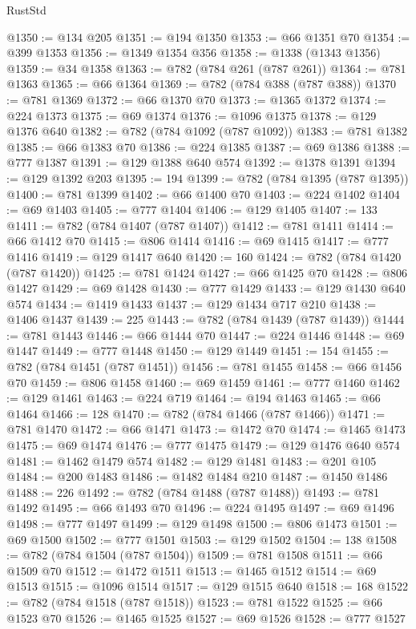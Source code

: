 \begin{lexlean}{RustStd}
\begin{coremodule}
@1350 := @134 @205
@1351 := @194 @1350
@1353 := @66 @1351 @70
@1354 := @399 @1353
@1356 := @1349 @1354 @356
@1358 := @1338 (@1343 @1356)
@1359 := @34 @1358
@1363 := @782 (@784 @261 (@787 @261))
@1364 := @781 @1363
@1365 := @66 @1364
@1369 := @782 (@784 @388 (@787 @388))
@1370 := @781 @1369
@1372 := @66 @1370 @70
@1373 := @1365 @1372
@1374 := @224 @1373
@1375 := @69 @1374
@1376 := @1096 @1375
@1378 := @129 @1376 @640
@1382 := @782 (@784 @1092 (@787 @1092))
@1383 := @781 @1382
@1385 := @66 @1383 @70
@1386 := @224 @1385
@1387 := @69 @1386
@1388 := @777 @1387
@1391 := @129 @1388 @640 @574
@1392 := @1378 @1391
@1394 := @129 @1392 @203
@1395 := 194
@1399 := @782 (@784 @1395 (@787 @1395))
@1400 := @781 @1399
@1402 := @66 @1400 @70
@1403 := @224 @1402
@1404 := @69 @1403
@1405 := @777 @1404
@1406 := @129 @1405
@1407 := 133
@1411 := @782 (@784 @1407 (@787 @1407))
@1412 := @781 @1411
@1414 := @66 @1412 @70
@1415 := @806 @1414
@1416 := @69 @1415
@1417 := @777 @1416
@1419 := @129 @1417 @640
@1420 := 160
@1424 := @782 (@784 @1420 (@787 @1420))
@1425 := @781 @1424
@1427 := @66 @1425 @70
@1428 := @806 @1427
@1429 := @69 @1428
@1430 := @777 @1429
@1433 := @129 @1430 @640 @574
@1434 := @1419 @1433
@1437 := @129 @1434 @717 @210
@1438 := @1406 @1437
@1439 := 225
@1443 := @782 (@784 @1439 (@787 @1439))
@1444 := @781 @1443
@1446 := @66 @1444 @70
@1447 := @224 @1446
@1448 := @69 @1447
@1449 := @777 @1448
@1450 := @129 @1449
@1451 := 154
@1455 := @782 (@784 @1451 (@787 @1451))
@1456 := @781 @1455
@1458 := @66 @1456 @70
@1459 := @806 @1458
@1460 := @69 @1459
@1461 := @777 @1460
@1462 := @129 @1461
@1463 := @224 @719
@1464 := @194 @1463
@1465 := @66 @1464
@1466 := 128
@1470 := @782 (@784 @1466 (@787 @1466))
@1471 := @781 @1470
@1472 := @66 @1471
@1473 := @1472 @70
@1474 := @1465 @1473
@1475 := @69 @1474
@1476 := @777 @1475
@1479 := @129 @1476 @640 @574
@1481 := @1462 @1479 @574
@1482 := @129 @1481
@1483 := @201 @105
@1484 := @200 @1483
@1486 := @1482 @1484 @210
@1487 := @1450 @1486
@1488 := 226
@1492 := @782 (@784 @1488 (@787 @1488))
@1493 := @781 @1492
@1495 := @66 @1493 @70
@1496 := @224 @1495
@1497 := @69 @1496
@1498 := @777 @1497
@1499 := @129 @1498
@1500 := @806 @1473
@1501 := @69 @1500
@1502 := @777 @1501
@1503 := @129 @1502
@1504 := 138
@1508 := @782 (@784 @1504 (@787 @1504))
@1509 := @781 @1508
@1511 := @66 @1509 @70
@1512 := @1472 @1511
@1513 := @1465 @1512
@1514 := @69 @1513
@1515 := @1096 @1514
@1517 := @129 @1515 @640
@1518 := 168
@1522 := @782 (@784 @1518 (@787 @1518))
@1523 := @781 @1522
@1525 := @66 @1523 @70
@1526 := @1465 @1525
@1527 := @69 @1526
@1528 := @777 @1527

\end{coremodule}
\end{lexlean}
